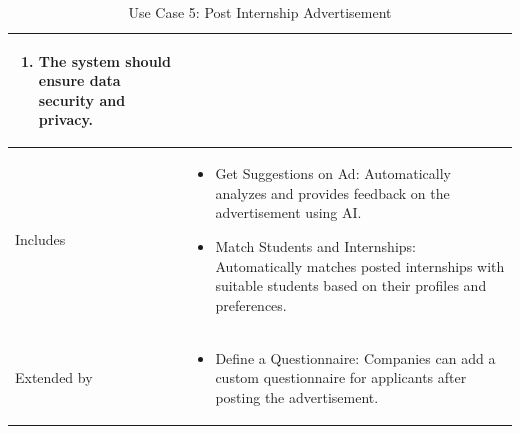 \begin{table}[H]
\begin{tabular}{|l|p{12cm}|}
\begin{enumerate}
    \item The system should ensure data security and privacy.
\end{enumerate} \\ \hline
Includes         & 
\begin{itemize}
    \item Get Suggestions on Ad: Automatically analyzes and provides feedback on the advertisement using AI.
    \item Match Students and Internships: Automatically matches posted internships with suitable students based on their profiles and preferences.
\end{itemize} \\ \hline
Extended by          & 
\begin{itemize}
    \item Define a Questionnaire: Companies can add a custom questionnaire for applicants after posting the advertisement.
\end{itemize} \\ \hline
\end{tabular}
\caption{Use Case 5: Post Internship Advertisement}
\label{tab:post_internship}
\end{table}

